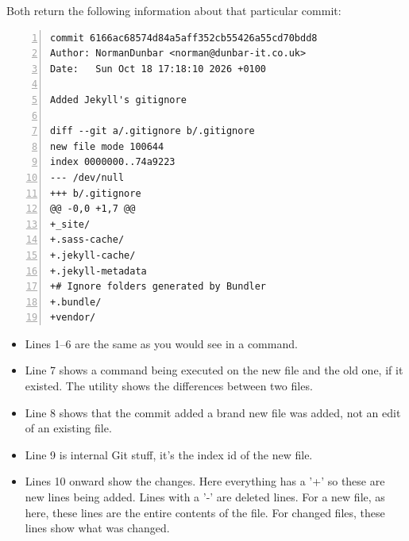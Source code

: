 Both return the following information about that particular commit:

\begin{lstlisting}[style=myText,numbers=left]
commit 6166ac68574d84a5aff352cb55426a55cd70bdd8
Author: NormanDunbar <norman@dunbar-it.co.uk>
Date:   Sun Oct 18 17:18:10 2026 +0100

Added Jekyll's gitignore

diff --git a/.gitignore b/.gitignore
new file mode 100644
index 0000000..74a9223
--- /dev/null
+++ b/.gitignore
@@ -0,0 +1,7 @@
+_site/
+.sass-cache/
+.jekyll-cache/
+.jekyll-metadata
+# Ignore folders generated by Bundler
+.bundle/
+vendor/
\end{lstlisting}

\begin{itemize}
    \item Lines 1--6 are the same as you would see in a  command.
    \item Line 7 shows a  command being executed on the new file and the old one, if it existed. The  utility shows the differences between two files.
    \item Line 8 shows that the commit added a brand new file was added, not an edit of an existing file.
    \item Line 9 is internal Git stuff, it's the index id of the new file.
    \item Lines 10 onward show the changes. Here everything has a '+' so these are new lines being added. Lines with a '-' are deleted lines. For a new file, as here, these lines are the entire contents of the file. For changed files, these lines show what was changed.
\end{itemize}
